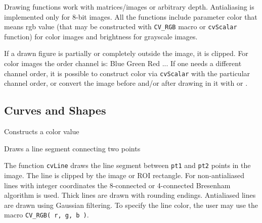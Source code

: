 Drawing functions work with matrices/images or arbitrary depth.
Antialiasing is implemented only for 8-bit images. All the functions
include parameter color that means rgb value (that may be constructed
with \texttt{CV\_RGB} macro or \texttt{cvScalar} function) for color
images and brightness for grayscale images.

If a drawn figure is partially or completely outside the image, it
is clipped. For color images the order channel is: Blue Green Red
... If one needs a different channel order, it is possible to
construct color via \texttt{cvScalar} with the particular channel
order, or convert the image before and/or after drawing in it with
 or .

\subsection{Curves and Shapes}

\label{CV_RGB}

Constructs a color value


\label{Line}

Draws a line segment connecting two points


\begin{description}
\end{description}

The function \texttt{cvLine} draws the line segment between
\texttt{pt1} and \texttt{pt2} points in the image. The line is
clipped by the image or ROI rectangle. For non-antialiased lines
with integer coordinates the 8-connected or 4-connected Bresenham
algorithm is used. Thick lines are drawn with rounding endings.
Antialiased lines are drawn using Gaussian filtering. To specify
the line color, the user may use the macro
\texttt{CV\_RGB( r, g, b )}.

